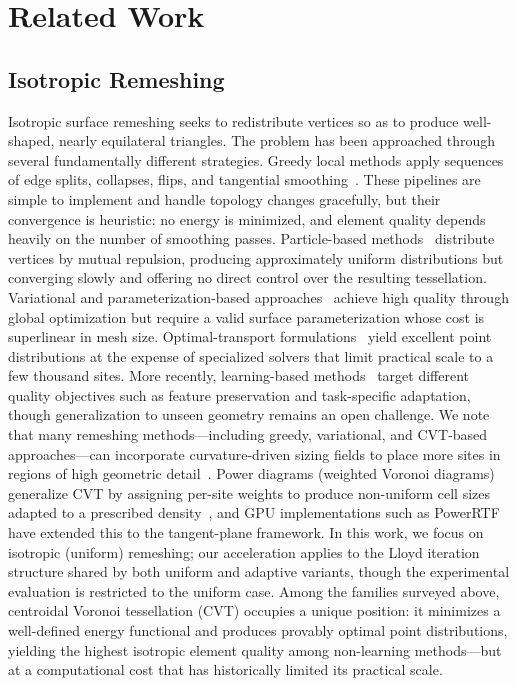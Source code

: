 \section{Related Work}
\label{sec:related}

\subsection{Isotropic Remeshing}

Isotropic surface remeshing seeks to redistribute vertices so as to produce well-shaped, nearly equilateral triangles. The problem has been approached through several fundamentally different strategies. Greedy local methods apply sequences of edge splits, collapses, flips, and tangential smoothing~\cite{hoppe1996progressive, botsch2004remeshing, dunyach2013adaptive}. These pipelines are simple to implement and handle topology changes gracefully, but their convergence is heuristic: no energy is minimized, and element quality depends heavily on the number of smoothing passes. Particle-based methods~\cite{turk1992retiling, witkin1994particles} distribute vertices by mutual repulsion, producing approximately uniform distributions but converging slowly and offering no direct control over the resulting tessellation. Variational and parameterization-based approaches~\cite{alliez2003anisotropic, alliez2005centroidal, cohensteiner2004variational} achieve high quality through global optimization but require a valid surface parameterization whose cost is superlinear in mesh size. Optimal-transport formulations~\cite{degoes2012blue, mehta2012blue} yield excellent point distributions at the expense of specialized solvers that limit practical scale to a few thousand sites. More recently, learning-based methods~\cite{liu2020neural, potamias2022neural, sharp2022diffusion} target different quality objectives such as feature preservation and task-specific adaptation, though generalization to unseen geometry remains an open challenge. We note that many remeshing methods---including greedy, variational, and CVT-based approaches---can incorporate curvature-driven sizing fields to place more sites in regions of high geometric detail~\cite{alliez2003anisotropic, dunyach2013adaptive, levy2010lp}. Power diagrams (weighted Voronoi diagrams) generalize CVT by assigning per-site weights to produce non-uniform cell sizes adapted to a prescribed density~\cite{aurenhammer1987power, degoes2012blue}, and GPU implementations such as PowerRTF~\cite{yao2023rtf} have extended this to the tangent-plane framework. In this work, we focus on isotropic (uniform) remeshing; our acceleration applies to the Lloyd iteration structure shared by both uniform and adaptive variants, though the experimental evaluation is restricted to the uniform case. Among the families surveyed above, centroidal Voronoi tessellation (CVT) occupies a unique position: it minimizes a well-defined energy functional and produces provably optimal point distributions, yielding the highest isotropic element quality among non-learning methods---but at a computational cost that has historically limited its practical scale.

